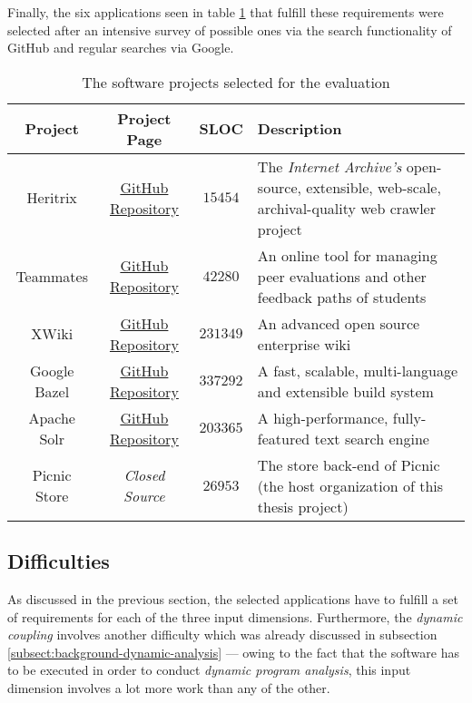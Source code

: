 \documentclass[12pt,a4paper]{report}
\begin{document}
Finally, the six applications seen in table \ref{table:evaluation-projects}
that fulfill these requirements were selected after an intensive survey
of possible ones via the search functionality of GitHub and regular searches via Google.

\begin{table}[h!]
\def\arraystretch{1.55}
\begin{tabularx}{\textwidth}{|c|c|c|X|}
\hline
Project & Project Page & SLOC & Description \\
\hline\hline

Heritrix        & \href{https://github.com/internetarchive/heritrix3}{GitHub Repository} & $15454$ &
The \textit{Internet Archive's} open-source, extensible, web-scale, archival-quality web
crawler project \\\hline

Teammates       & \href{https://github.com/TEAMMATES/teammates}{GitHub Repository} & $42280$ &
An online tool for managing peer evaluations and other feedback paths of students \\\hline

XWiki           & \href{https://github.com/xwiki/xwiki-platform}{GitHub Repository} & $231349$ &
An advanced open source enterprise wiki \\\hline

Google Bazel    & \href{https://github.com/bazelbuild/bazel}{GitHub Repository} & $337292$ &
A fast, scalable, multi-language and extensible build system \\\hline

Apache Solr     & \href{https://github.com/apache/lucene-solr}{GitHub Repository} & $203365$ &
A high-performance, fully\hyp featured text search engine \\\hline

Picnic Store & \textit{Closed Source} & $26953$ &
The store back-end of Picnic (the host organization of this thesis project) \\\hline

\end{tabularx}
\caption{The software projects selected for the evaluation}
\label{table:evaluation-projects}
\end{table}


\subsection{Difficulties} \label{subsect:difficulties}

As discussed in the previous section, the selected applications have to fulfill
a set of requirements for each of the three input dimensions.
Furthermore, the \textit{dynamic coupling} involves another difficulty which
was already discussed in subsection \ref{subsect:background-dynamic-analysis} ---
owing to the fact that the software has to be executed in order to conduct
\textit{dynamic program analysis}, this input dimension involves a lot more work
than any of the other.
\end{document}
